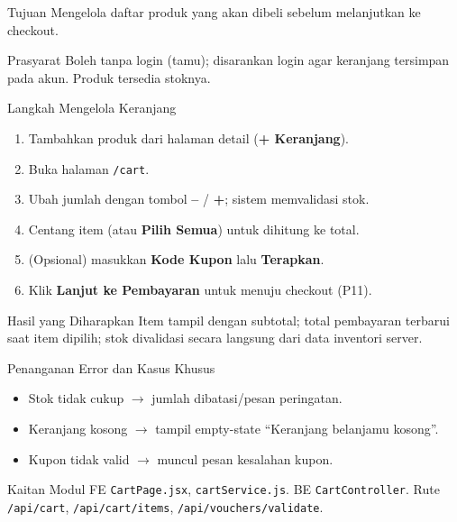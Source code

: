 
\begin{flowsection}{Tujuan}
Mengelola daftar produk yang akan dibeli sebelum melanjutkan ke checkout.
\end{flowsection}

\begin{flowsection}{Prasyarat}
Boleh tanpa login (tamu); disarankan login agar keranjang tersimpan pada akun.
Produk tersedia stoknya.
\end{flowsection}

\begin{flowsection}{Langkah Mengelola Keranjang}
\begin{enumerate}
  \item Tambahkan produk dari halaman detail (\textbf{+ Keranjang}).
  \item Buka halaman \texttt{/cart}.
  \item Ubah jumlah dengan tombol \textbf{--} / \textbf{+}; sistem memvalidasi stok.
  \item Centang item (atau \textbf{Pilih Semua}) untuk dihitung ke total.
  \item (Opsional) masukkan \textbf{Kode Kupon} lalu \textbf{Terapkan}.
  \item Klik \textbf{Lanjut ke Pembayaran} untuk menuju checkout (P11).
\end{enumerate}
\end{flowsection}


\begin{flowsection}{Hasil yang Diharapkan}
Item tampil dengan subtotal; total pembayaran terbarui saat item dipilih; stok
divalidasi secara langsung dari data inventori server.
\end{flowsection}


\begin{flowsection}{Penanganan Error dan Kasus Khusus}
\begin{itemize}
  \item Stok tidak cukup $\rightarrow$ jumlah dibatasi/pesan peringatan.
  \item Keranjang kosong $\rightarrow$ tampil empty-state ``Keranjang belanjamu kosong''.
  \item Kupon tidak valid $\rightarrow$ muncul pesan kesalahan kupon.
\end{itemize}
\end{flowsection}

\begin{flowsection}{Kaitan Modul}
FE \texttt{CartPage.jsx}, \texttt{cartService.js}. BE \texttt{CartController}. Rute
\texttt{/api/cart}, \texttt{/api/cart/items}, \texttt{/api/vouchers/validate}.
\end{flowsection}

